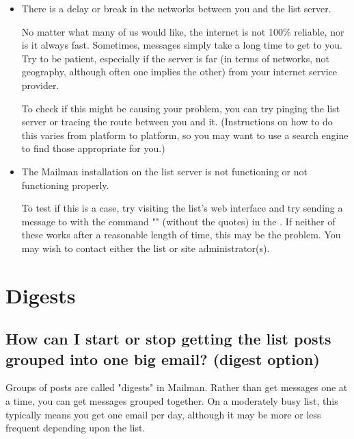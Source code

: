 \documentclass{howto}
\begin{document}
\begin{itemize}

	\item There is a delay or break in the networks between you and the 
	list server.

	No matter what many of us would like, the internet is not 100\% 
	reliable, nor is it always fast.  Sometimes, messages simply take a long 
	time to get to you.  Try to be patient, especially if the server is far 
	(in terms of networks, not geography, although often one implies the other)
	from your internet service provider.

	To check if this might be causing your problem, you can try pinging
	the list server or tracing the route between you and it.  (Instructions
	on how to do this varies from platform to platform, so you may want to 
	use a search engine to find those appropriate for you.)

	\item The Mailman installation on the list server is not functioning or
	not functioning properly.
	
	To test if this is a case, try visiting the list's web interface and 
	try sending a message to  with the command 
	"" (without the quotes) in the .  If 
	neither of these works after a reasonable length of time, this may be
	the problem.  You may wish to contact either the list or site 
	administrator(s).
\end{itemize}


\section{Digests}
\subsection{How can I start or stop getting the list posts grouped into one 
big email? (digest option)\label{sec:digest}}

Groups of posts are called "digests" in Mailman.  Rather than get messages
one at a time, you can get messages grouped together.  On a moderately busy
list, this typically means you get one email per day, although it may be
more or less frequent depending upon the list.
\end{document}
